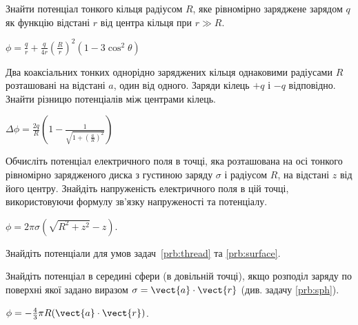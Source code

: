 \begin{problem}
Знайти потенціал тонкого кільця радіусом $R$, яке рівномірно заряджене зарядом $q$ як функцію відстані $r$ від центра кільця при $r \gg R$.
\begin{solution}
	$\phi = \frac{q}{r} + \frac{q}{4r}\left(\frac{R}{r} \right)^2(1-3\cos^2\theta) $
\end{solution}
\end{problem}

\begin{problem}
Два коаксіальних тонких однорідно заряджених кільця однаковими радіусами $R$ розташовані на відстані $a$, один від одного. Заряди кілець $+q$ і
$-q$ відповідно. Знайти різницю потенціалів між центрами кілець.
\begin{solution}
	$\Delta\phi = \frac{2q}{R}\left(1 - \frac{1}{\sqrt{1 + \left(\frac{a}{R} \right)^2}}\right)$
\end{solution}
\end{problem}

\begin{problem}
Обчисліть потенціал електричного поля в точці, яка розташована на осі тонкого рівномірно зарядженого диска з густиною заряду $\sigma$ і радіусом $R$, на відстані $z$ від його центру. Знайдіть напруженість електричного поля в цій точці, використовуючи формулу зв'язку напруженості та потенціалу.
\begin{solution}
	$\phi = 2\pi\sigma  \left( \sqrt{R^2 + z^2} - z \right) $.
\end{solution}
\end{problem}

\begin{problem}
    Знайдіть потенціали для умов задач~\ref{prb:thread} та \ref{prb:surface}.
\end{problem}

\begin{problem}
    Знайдіть потенціал в середині сфери (в довільній точці), якщо розподіл заряду по поверхні якої задано виразом $\sigma = \vect{a}\cdot\vect{r}$ (див. задачу \ref{prb:sph}).
\begin{solution}
	$\phi = -\frac43\pi R (\vect{a}\cdot\vect{r})$.
\end{solution}
\end{problem}

